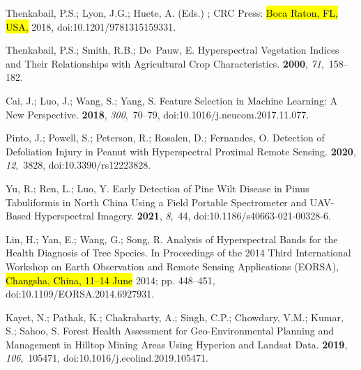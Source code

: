 \documentclass[remotesensing,article,accept,moreauthors,pdftex]{Definitions/mdpi}
\begin{document}
\begin{thebibliography}{999}
Thenkabail, P.S.; Lyon, J.G.; Huete, A. (Eds.)
; {CRC Press}:  \hl{Boca Raton, FL, USA,} %
 2018, doi:10.1201/9781315159331.

Thenkabail, P.S.; Smith, R.B.; De~Pauw, E.
\newblock Hyperspectral Vegetation Indices and Their Relationships with
  Agricultural Crop Characteristics.
 {\bf 2000}, {\em 71},~158--182.

Cai, J.; Luo, J.; Wang, S.; Yang, S.
\newblock Feature Selection in Machine Learning: A New Perspective.
 {\bf 2018}, {\em 300},~70--79, doi:10.1016/j.neucom.2017.11.077.

Pinto, J.; Powell, S.; Peterson, R.; Rosalen, D.; Fernandes, O.
\newblock Detection of {{Defoliation Injury}} in {{Peanut}} with
  {{Hyperspectral Proximal Remote Sensing}}.
 {\bf 2020}, {\em 12},~3828, doi:10.3390/rs12223828.

Yu, R.; Ren, L.; Luo, Y.
\newblock Early Detection of Pine Wilt Disease in {{Pinus}} Tabuliformis in
  {{North China}} Using a Field Portable Spectrometer and {{UAV}}-Based
  Hyperspectral Imagery.
 {\bf 2021}, {\em 8},~44, doi:10.1186/s40663-021-00328-6.

Lin, H.; Yan, E.; Wang, G.; Song, R.
\newblock Analysis of Hyperspectral Bands for the Health Diagnosis of Tree
  Species.
\newblock  In Proceedings of the 2014 {{Third International Workshop}} on {{Earth Observation}} and
  {{Remote Sensing Applications}} ({{EORSA}}),  \hl{Changsha, China, 11--14 June} %
 2014; pp. 448--451, doi:10.1109/EORSA.2014.6927931.

Kayet, N.; Pathak, K.; Chakrabarty, A.; Singh, C.P.; Chowdary, V.M.; Kumar, S.;
  Sahoo, S.
\newblock Forest Health Assessment for Geo-Environmental Planning and
  Management in Hilltop Mining Areas Using {{Hyperion}} and {{Landsat}} Data.
 {\bf 2019}, {\em 106},~105471, doi:10.1016/j.ecolind.2019.105471.


\end{thebibliography}
\end{document}
